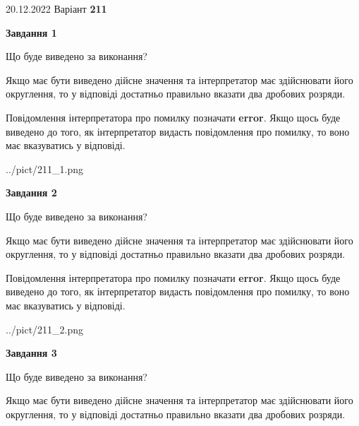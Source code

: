 \documentclass[12pt, ukrainian]{article}
\begin{document}
{20.12.2022 Варіант \No \textbf { 211 }\par}
{
\begin {Large}

{\begin {center}\textbf{Завдання 1}\end {center}}\par
Що буде виведено за виконання? \par

Якщо має бути виведено дійсне значення та інтерпретатор має здійснювати його округлення, 
то у відповіді достатньо правильно вказати два дробових розряди.

Повідомлення інтерпретатора про помилку позначати \textbf{error}.
Якщо щось буде виведено до того, як інтерпретатор видасть повідомлення про помилку, 
то воно має вказуватись у відповіді. \par

\begin{center}
	{../pict/211_1.png}
\end{center}
\newpage

{\begin {center}\textbf{Завдання 2}\end {center}}\par
Що буде виведено за виконання? \par

Якщо має бути виведено дійсне значення та інтерпретатор має здійснювати його округлення, 
то у відповіді достатньо правильно вказати два дробових розряди.

Повідомлення інтерпретатора про помилку позначати \textbf{error}.
Якщо щось буде виведено до того, як інтерпретатор видасть повідомлення про помилку, 
то воно має вказуватись у відповіді. \par

\begin{center}
	{../pict/211_2.png}
\end{center}
\newpage

{\begin {center}\textbf{Завдання 3}\end {center}}\par
Що буде виведено за виконання? \par

Якщо має бути виведено дійсне значення та інтерпретатор має здійснювати його округлення, 
то у відповіді достатньо правильно вказати два дробових розряди.


\end{Large}}
\end{document}
